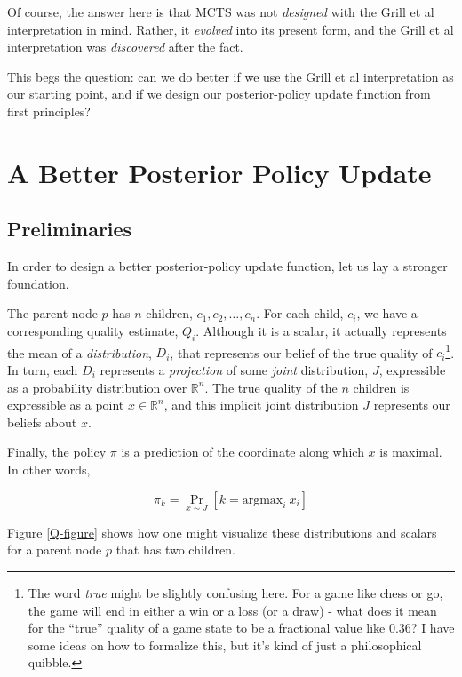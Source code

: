 \documentclass[tikz]{article}
\newcommand{\argmax}{\mathrm{argmax}}
\begin{document}
Of course, the answer here is that MCTS was not \textit{designed} with the Grill et al interpretation in mind. Rather, it \textit{evolved} into
its present form, and the Grill et al interpretation was \textit{discovered} after the fact. \newline

This begs the question: can we do better if we use the Grill et al interpretation as our starting point, and if we design our posterior-policy update
function from first principles?

\section{A Better Posterior Policy Update}

\subsection{Preliminaries}

In order to design a better posterior-policy update function, let us lay a stronger foundation. \newline

The parent node $p$ has $n$ children, $c_1, c_2, \ldots, c_n$. For each child, $c_i$, we have a corresponding
quality estimate, $Q_i$.
Although it is a scalar, it actually represents the mean of a \emph{distribution}, $D_i$, that represents our belief of the
true quality of $c_i$\footnote{The word \emph{true} might be slightly confusing here. For a game like chess or go, the game will
end in either a win or a loss (or a draw) - what does it mean for the ``true'' quality of a game state to be a fractional value like 0.36?
I have some ideas on how to formalize this, but it's kind of just a philosophical quibble.}.
In turn, each $D_i$ represents a \emph{projection} of some \emph{joint} distribution, $J$, expressible as
a probability distribution over $\mathbb{R}^n$. The true quality of the $n$ children is expressible as a point $x \in \mathbb{R}^n$,
and this implicit joint distribution $J$ represents our beliefs about $x$.\newline

Finally, the policy $\pi$ is a prediction of the coordinate along which $x$ is maximal. In other words,

$$
\pi_k = \Pr_{x \sim J}[k = \argmax_i\ x_i]
$$

Figure \ref{Q-figure} shows how one might visualize these distributions and scalars for a parent node $p$ that has two children. 
\end{document}
